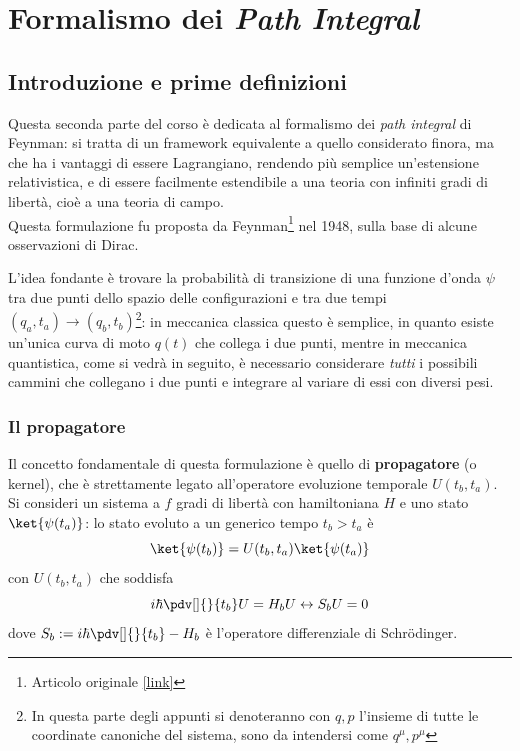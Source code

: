 \newpage
\chapter{Formalismo dei \textit{Path Integral}}

\section{Introduzione e prime definizioni}
Questa seconda parte del corso è dedicata al formalismo dei \textit{path integral} di Feynman:
si tratta di un framework equivalente a quello considerato finora, ma che ha i vantaggi di essere 
Lagrangiano, rendendo più semplice un'estensione relativistica, e di essere facilmente estendibile a
una teoria con infiniti gradi di libertà, cioè a una teoria di campo.\\
Questa formulazione fu proposta da Feynman\footnote
{Articolo originale \hyperlink{https://web.archive.org/web/20200917091657/https://authors.library.caltech.edu/47756/1/FEYrmp48.pdf}{[link]}}
nel 1948, sulla base di alcune osservazioni di Dirac.

L'idea fondante è trovare la probabilità di transizione di una funzione d'onda $\psi$ tra due punti dello
spazio delle configurazioni e tra due tempi $\left(q_a,t_a\right)\rightarrow\left(q_b,t_b\right)$\footnote
{In questa parte degli appunti si denoteranno con $q,p$ l'insieme di tutte le coordinate canoniche del
sistema, sono da intendersi come $q^\mu,p^\mu$}:
in meccanica classica questo è semplice, in quanto esiste un'unica curva di moto $q(t)$ che collega i
due punti, mentre in meccanica quantistica, come si vedrà in seguito, è necessario considerare \textit{tutti}
i possibili cammini che collegano i due punti e integrare al variare di essi con diversi pesi.

\subsection{Il propagatore}
Il concetto fondamentale di questa formulazione è quello di \textbf{propagatore} (o kernel), che è
strettamente legato all'operatore evoluzione temporale $U(t_b,t_a)$.\\
Si consideri un sistema a $f$ gradi di libertà con hamiltoniana $H$ e uno stato $\ket{\psi(t_a)}$:
lo stato evoluto a un generico tempo $t_b>t_a$ è
$$\ket{\psi(t_b)}=U(t_b,t_a)\ket{\psi(t_a)}$$
con $U(t_b,t_a)$ che soddisfa
$$i\hbar\pdv[]{}{t_b}U = H_bU \leftrightarrow S_bU=0$$
dove $S_b:=i\hbar\pdv[]{}{t_b}-H_b$ è l'operatore differenziale di Schrödinger.

